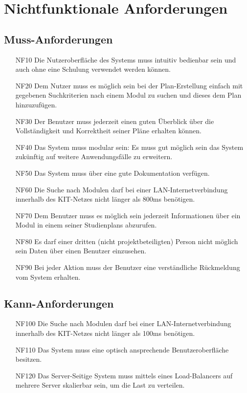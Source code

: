 \section{Nichtfunktionale Anforderungen}
\subsection{Muss-Anforderungen}
\begin{itemize}[nosep]
	\item[NF10]
		Die Nutzeroberfläche des Systems muss intuitiv bedienbar sein und auch ohne eine Schulung verwendet werden können.
	\item[NF20]
		Dem Nutzer muss es möglich sein bei der Plan-Erstellung einfach mit gegebenen Suchkriterien nach einem \gls{Modul} zu suchen und dieses dem Plan hinzuzufügen.
	\item[NF30]
		Der \gls{Benutzer} muss jederzeit einen guten Überblick über die Vollständigkeit und Korrektheit seiner Pläne erhalten können.
	\item[NF40]
		Das System muss modular sein: Es muss gut möglich sein das System zukünftig auf weitere Anwendungsfälle zu erweitern.
	\item[NF50]
		Das System muss über eine gute Dokumentation verfügen.
	\item[NF60]
		Die Suche nach Modulen darf bei einer LAN-Internetverbindung innerhalb des KIT-Netzes nicht länger als 800ms benötigen.
	\item[NF70]
		Dem \gls{Benutzer} muss es möglich sein jederzeit Informationen über ein Modul in einem seiner \glspl{Studienplan} abzurufen.
	\item[NF80]
		Es darf einer dritten (nicht projektbeteiligten) Person nicht möglich sein Daten über einen \gls{Benutzer} einzusehen.
	\item[NF90]
		Bei jeder Aktion muss der \gls{Benutzer} eine verständliche Rückmeldung vom System erhalten.
\end{itemize}
\subsection{Kann-Anforderungen}
\begin{itemize}[nosep]
	\item[NF100]
		Die Suche nach Modulen darf bei einer LAN-Internetverbindung innerhalb des KIT-Netzes nicht länger als 100ms benötigen.
	\item[NF110]
		Das System muss eine optisch ansprechende Benutzeroberfläche besitzen.
	\item[NF120]
		Das Server-Seitige System muss mittels eines Load-Balancers auf mehrere Server skalierbar sein, um die Last zu verteilen.
\end{itemize}
